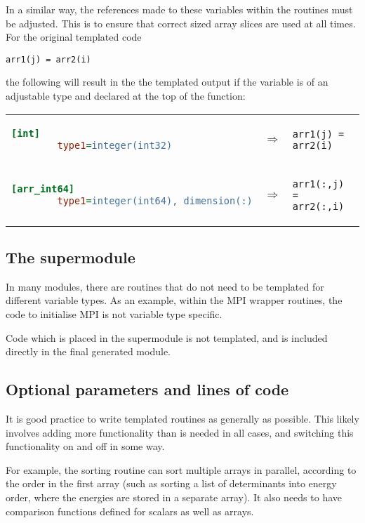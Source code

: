 \documentclass[a4paper,notitlepage,dvipsnames]{scrreprt}
\begin{document}
{{	In a similar way, the references made to these variables within the
	routines must be adjusted. This is to ensure that correct sized array
	slices are used at all times. For the original templated code
	\begin{lstlisting}[gobble=4]
		arr1(j) = arr2(i)
	\end{lstlisting}
	the following will result in the the templated output if the variable is
	of an adjustable type and declared at the top of the function:

	\begin{tabular}{lcl}
	\begin{lstlisting}[language=ini,gobble=8]
		[int]
		type1=integer(int32)
	\end{lstlisting}
	& $\Longrightarrow$ &
	\begin{lstlisting}[gobble=8]
		arr1(j) = arr2(i)
	\end{lstlisting} \\[1.5em]

	\begin{lstlisting}[language=ini,gobble=8]
		[arr_int64]
		type1=integer(int64), dimension(:)
	\end{lstlisting}
	& $\Longrightarrow$ &
	\begin{lstlisting}[gobble=8]
		arr1(:,j) = arr2(:,i)
	\end{lstlisting}
	\end{tabular}

\subsection{The supermodule}
	In many modules, there are routines that do not need to be templated for
	different variable types. As an example, within the MPI wrapper routines,
	the code to initialise MPI is not variable type specific.

	Code which is placed in the supermodule is not templated, and is included
	directly in the final generated module.

\subsection{Optional parameters and lines of code}
	It is good practice to write templated routines as generally as possible.
	This likely involves adding more functionality than is needed in all cases,
	and switching this functionality on and off in some way.

	For example, the sorting routine can sort multiple arrays in parallel,
	according to the order in the first array (such as sorting a list of
	determinants into energy order, where the energies are stored in a separate
	array). It also needs to have comparison functions defined for scalars as
	well as arrays.

}}
\end{document}
